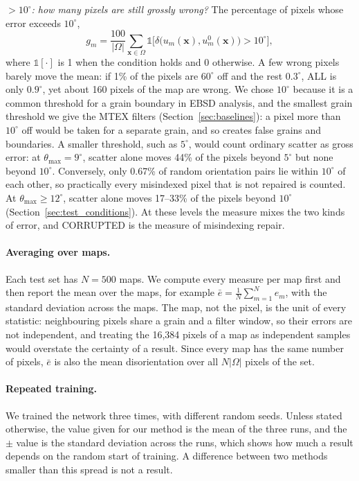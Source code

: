 \emph{${>}10^\circ$: how many pixels are still grossly wrong?} The percentage
of pixels whose error exceeds $10^\circ$,
\begin{equation}
  g_m = \frac{100}{|\Omega|} \sum_{\mathbf{x} \in \Omega}
        \mathbb{1}\Big[\delta\big(u_m(\mathbf{x}), u^0_m(\mathbf{x})\big) > 10^\circ\Big],
  \label{eq:gross}
\end{equation}
where $\mathbb{1}[\cdot]$ is 1 when the condition holds and 0 otherwise. A few
wrong pixels barely move the mean: if 1\% of the pixels are $60^\circ$ off and
the rest $0.3^\circ$, ALL is only $0.9^\circ$, yet about 160 pixels of the map
are wrong. We chose $10^\circ$ because it is a common threshold for a grain
boundary in EBSD analysis, and the smallest grain threshold we give the MTEX
filters (Section~\ref{sec:baselines}): a pixel more than $10^\circ$ off would be
taken for a separate grain, and so creates false grains and boundaries. A
smaller threshold, such as $5^\circ$, would count ordinary scatter as gross
error: at $\theta_{\max} = 9^\circ$, scatter alone moves 44\% of the pixels
beyond $5^\circ$ but none beyond $10^\circ$. Conversely, only 0.67\% of
random orientation pairs lie within $10^\circ$ of each other, so practically
every misindexed pixel that is not repaired is counted. At
$\theta_{\max} \geq 12^\circ$, scatter alone moves 17--33\% of the pixels
beyond $10^\circ$ (Section~\ref{sec:test_conditions}). At these levels the
measure mixes the two kinds of error, and CORRUPTED is the measure of
misindexing repair.

\paragraph{Averaging over maps.}
Each test set has $N = 500$ maps. We compute every measure per map first and
then report the mean over the maps, for example
$\bar{e} = \frac{1}{N}\sum_{m=1}^{N} e_m$, with the standard deviation across
the maps. The map, not the pixel, is the unit of every statistic: neighbouring
pixels share a grain and a filter window, so their errors are not independent,
and treating the 16{,}384 pixels of a map as independent samples would
overstate the certainty of a result. Since every map has the same number of
pixels, $\bar{e}$ is also the mean disorientation over all $N|\Omega|$ pixels
of the set.

\paragraph{Repeated training.}
We trained the network three times, with different random seeds. Unless
stated otherwise, the value given for our method is the mean of the three
runs, and the $\pm$ value is the standard deviation across the runs, which
shows how much a result depends on the random start of training. A
difference between two methods smaller than this spread is not a result.

